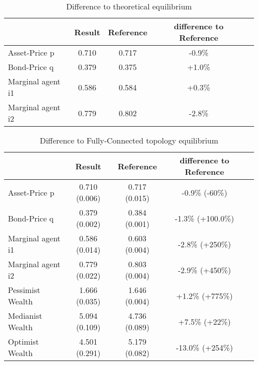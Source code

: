 \documentclass[Bachelorarbeit.tex]{subfiles}
\begin{document}
\begin{table}[H]
	\caption{Difference to theoretical equilibrium}
	\centering
	\begin{tabular} { l c c c r }
		& Result & Reference & difference to Reference \\
		\hline
		Asset-Price p & 0.710 & 0.717 & -0.9\% \\
		Bond-Price q & 0.379 & 0.375 & +1.0\% \\
		Marginal agent i1 & 0.586 & 0.584 & +0.3\% \\
		Marginal agent i2 & 0.779 & 0.802 & -2.8\% \\
		\hline
	\end{tabular}
\end{table}

\begin{table}[H]
	\caption{Difference to Fully-Connected topology equilibrium}
	\centering
	\begin{tabular} { l c c c r }
		& Result & Reference & difference to Reference \\
		\hline
		Asset-Price p & 0.710 (0.006) & 0.717 (0.015) & -0.9\% (-60\%) \\
		Bond-Price q & 0.379 (0.002) & 0.384 (0.001) & -1.3\% (+100.0\%) \\
		Marginal agent i1 & 0.586 (0.014) & 0.603 (0.004) & -2.8\% (+250\%) \\
		Marginal agent i2 & 0.779 (0.022) & 0.803 (0.004) & -2.9\% (+450\%) \\
		\hline
		Pessimist Wealth & 1.666 (0.035) & 1.646 (0.004) & +1.2\% (+775\%) \\
		Medianist Wealth & 5.094 (0.109) & 4.736 (0.089) & +7.5\% (+22\%) \\
		Optimist Wealth & 4.501 (0.291) & 5.179 (0.082) & -13.0\% (+254\%) \\
		\hline
	\end{tabular}
\end{table}
\end{document}
